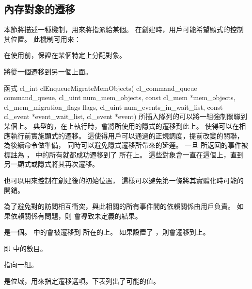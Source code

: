 \subsection{內存對象的遷移}

本節將描述一種機制，用來將指派給某個。
在創建時，用戶可能希望顯式的控制其位置。
此機制可用來：
\startigBase
\item 在使用前，保證在某個特定上分配對象。

\item 將從一個遷移到另一個上面。
\stopigBase

函式
\startCLFUNC
cl_int clEnqueueMigrateMemObjects(
			cl_command_queue command_queue,
			cl_uint num_mem_objects,
			const cl_mem *mem_objects,
			cl_mem_migration_flags flags,
			cl_uint num_events_in_wait_list,
			const cl_event *event_wait_list,
			cl_event *event)
\stopCLFUNC
所插入隊列的可以將一組強制關聯到某個上。
典型的，在上執行時，會將所使用的隱式的遷移到此上。
 使得可以在相應執行前實施顯式的遷移。
這使得用戶可以通過的正規調度，提前改變的關聯，為後續命令做準備，
同時可以避免隱式遷移所帶來的延遲。
一旦  所返回的事件被標註為 ，
  中的所有就都成功遷移到了  所在上。
這些對象會一直在這個上，直到另一顯式或隱式將其再次遷移。

 也可以用來控制在創建後的初始位置，
這樣可以避免第一條將其實體化時可能的開銷。

為了避免對的訪問相互衝突，與此相關的所有事件間的依賴關係由用戶負責。
如果依賴關係有問題，則  會導致未定義的結果。

 是一個。
  中的會被遷移到  所在的上。
如果設置了 ，則會遷移到上。

 即  中的數目。

 指向一組。

 是位域，用來指定遷移選項。下表列出了可能的值。

{}

